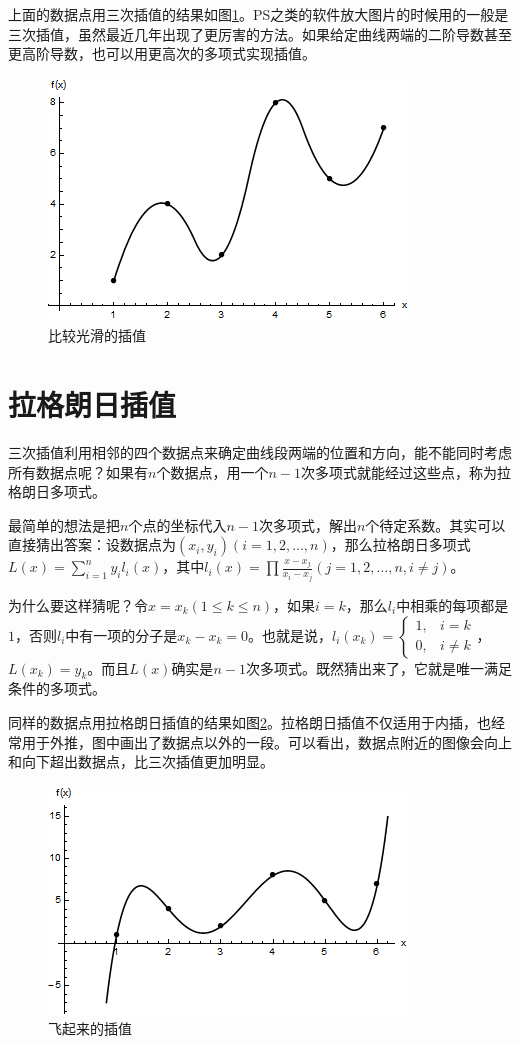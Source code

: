 上面的数据点用三次插值的结果如图\ref{fig-disc-data-cubic}。PS之类的软件放大图片的时候用的一般是三次插值，虽然最近几年出现了更厉害的方法。如果给定曲线两端的二阶导数甚至更高阶导数，也可以用更高次的多项式实现插值。
\begin{figure}[htb]
\centering
\includegraphics[scale=0.5]{fig/disc-data-cubic.png}
\caption{比较光滑的插值}
\label{fig-disc-data-cubic}
\end{figure}
\section{拉格朗日插值}
三次插值利用相邻的四个数据点来确定曲线段两端的位置和方向，能不能同时考虑所有数据点呢？如果有$n$个数据点，用一个$n-1$次多项式就能经过这些点，称为拉格朗日多项式。

最简单的想法是把$n$个点的坐标代入$n-1$次多项式，解出$n$个待定系数。其实可以直接猜出答案：设数据点为$(x_i,y_i)(i=1,2,\dots,n)$，那么拉格朗日多项式$L(x)=\sum_{i=1}^n y_i l_i(x)$，其中$l_i(x)=\prod \frac{x-x_j}{x_i-x_j}(j=1,2,\dots,n, i \ne j)$。

为什么要这样猜呢？令$x=x_k(1 \le k \le n)$，如果$i=k$，那么$l_i$中相乘的每项都是$1$，否则$l_i$中有一项的分子是$x_k-x_k=0$。也就是说，$l_i(x_k)=\begin{cases} 1, &i=k \\ 0, &i \ne k \end{cases}$，$L(x_k)=y_k$。而且$L(x)$确实是$n-1$次多项式。既然猜出来了，它就是唯一满足条件的多项式。

同样的数据点用拉格朗日插值的结果如图\ref{fig-disc-data-lag}。拉格朗日插值不仅适用于内插，也经常用于外推，图中画出了数据点以外的一段。可以看出，数据点附近的图像会向上和向下超出数据点，比三次插值更加明显。
\begin{figure}[htb]
\centering
\includegraphics[scale=0.5]{fig/disc-data-lag.png}
\caption{飞起来的插值}
\label{fig-disc-data-lag}
\end{figure}

